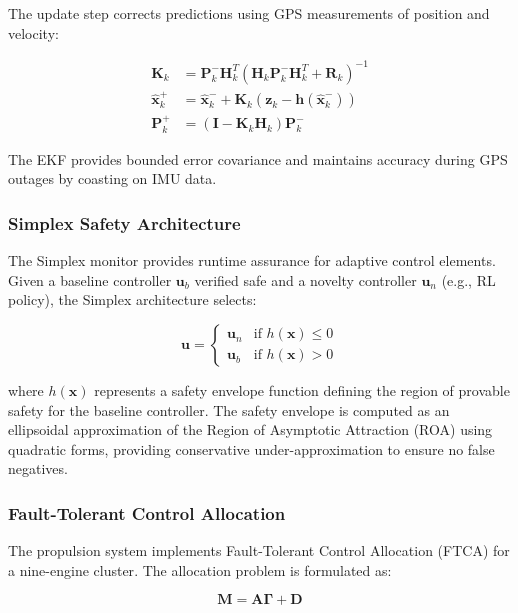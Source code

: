 \documentclass[10pt, conference, compsocconf]{IEEEtran}
\begin{document}
The update step corrects predictions using GPS measurements of position and velocity:

\begin{align}
\mathbf{K}_k &= \mathbf{P}_k^-\mathbf{H}_k^T(\mathbf{H}_k\mathbf{P}_k^-\mathbf{H}_k^T + \mathbf{R}_k)^{-1} \\
\hat{\mathbf{x}}_k^+ &= \hat{\mathbf{x}}_k^- + \mathbf{K}_k(\mathbf{z}_k - \mathbf{h}(\hat{\mathbf{x}}_k^-)) \\
\mathbf{P}_k^+ &= (\mathbf{I} - \mathbf{K}_k\mathbf{H}_k)\mathbf{P}_k^-
\end{align}

The EKF provides bounded error covariance and maintains accuracy during GPS outages by coasting on IMU data\cite{ijertekf}.

\subsubsection{Simplex Safety Architecture}
The Simplex monitor provides runtime assurance for adaptive control elements\cite{seto2025use}. Given a baseline controller $\mathbf{u}_b$ verified safe and a novelty controller $\mathbf{u}_n$ (e.g., RL policy), the Simplex architecture selects:

\begin{equation}
\mathbf{u} = \begin{cases}
\mathbf{u}_n & \text{if } h(\mathbf{x}) \leq 0 \\
\mathbf{u}_b & \text{if } h(\mathbf{x}) > 0
\end{cases}
\end{equation}

where $h(\mathbf{x})$ represents a safety envelope function defining the region of provable safety for the baseline controller\cite{seto2025use}. The safety envelope is computed as an ellipsoidal approximation of the Region of Asymptotic Attraction (ROA) using quadratic forms, providing conservative under-approximation to ensure no false negatives.

\subsubsection{Fault-Tolerant Control Allocation}
The propulsion system implements Fault-Tolerant Control Allocation (FTCA) for a nine-engine cluster\cite{mdpiftca}. The allocation problem is formulated as:

\begin{equation}
\mathbf{M} = \mathbf{A}\boldsymbol{\Gamma} + \mathbf{D}
\end{equation}
\end{document}
